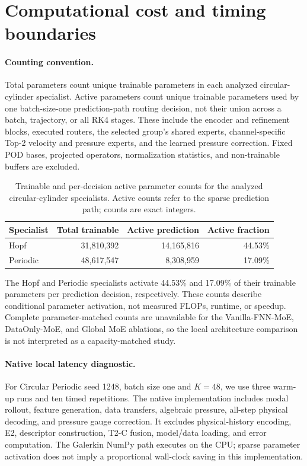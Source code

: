 \section{Computational cost and timing boundaries}
\label{app:parameter_counts}

\paragraph{Counting convention.}
Total parameters count unique trainable parameters in each analyzed
circular-cylinder specialist. Active parameters count unique trainable
parameters used by one batch-size-one prediction-path routing decision,
not their union across a batch, trajectory, or all RK4 stages. These include
the encoder and refinement blocks, executed routers, the selected group's
shared experts, channel-specific Top-2 velocity and pressure experts, and
the learned pressure correction. Fixed POD bases, projected operators,
normalization statistics, and non-trainable buffers are excluded.

\par
\begin{table}[H]
\centering
\caption{Trainable and per-decision active parameter counts for the analyzed
circular-cylinder specialists. Active counts refer to the sparse prediction
path; counts are exact integers.}
\label{tab:parameter_counts}
\begin{tabular}{lrrr}
\toprule
Specialist & Total trainable & Active prediction & Active fraction \\
\midrule
Hopf & 31,810,392 & 14,165,816 & 44.53\% \\
Periodic & 48,617,547 & 8,308,959 & 17.09\% \\
\bottomrule
\end{tabular}
\end{table}
\par

The Hopf and Periodic specialists activate 44.53\% and 17.09\% of their
trainable parameters per prediction decision, respectively. These counts
describe conditional parameter activation, not measured FLOPs, runtime,
or speedup. Complete parameter-matched counts are unavailable for the
Vanilla-FNN-MoE, DataOnly-MoE, and Global MoE ablations, so the local
architecture comparison is not interpreted as a capacity-matched study.

\paragraph{Native local latency diagnostic.}
For Circular Periodic seed 1248, batch size one and $K=48$, we use three
warm-up runs and ten timed repetitions. The native implementation
includes modal rollout, feature generation, data transfers, algebraic
pressure, all-step physical decoding, and pressure gauge correction.
It excludes physical-history encoding, E2, descriptor construction,
T2-C fusion, model/data loading, and error computation. The Galerkin
NumPy path executes on the CPU; sparse parameter activation does not
imply a proportional wall-clock saving in this implementation.

